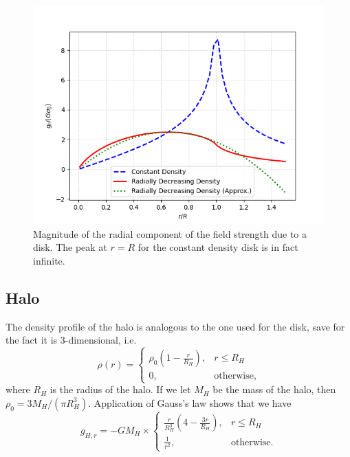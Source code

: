 \begin{figure}[htp]
    \centering
    \includegraphics[scale=0.6]{img/disk-field.png}
    \caption{Magnitude of the radial component of the field strength due to a disk.
        The peak at $r=R$ for the constant density disk is in fact infinite.}
    \label{fig:radial-strength-disk}
\end{figure}

\subsection{Halo}
The density profile of the halo is analogous to the one used for the disk, save for the fact it is 3-dimensional, i.e.
\begin{equation*}
    \rho(r) =
    \begin{cases}
        \rho_0\left(1 - \frac{r}{R_H}\right), & r \leq R_H        \\
        0,                                    & \text{otherwise},
    \end{cases}
\end{equation*}
where $R_H$ is the radius of the halo.
If we let $M_H$ be the mass of the halo, then $\rho_0 = 3M_H / (\pi R_H^3)$.
Application of Gauss's law shows that we have
\begin{equation*}
    g_{H,r} = -G M_H \times
    \begin{cases}
        \frac{r}{R_H^3}\left(4 - \frac{3r}{R_H}\right), & r \leq R_H        \\
        \frac{1}{r^2},                                  & \text{otherwise}.
    \end{cases}
\end{equation*}

